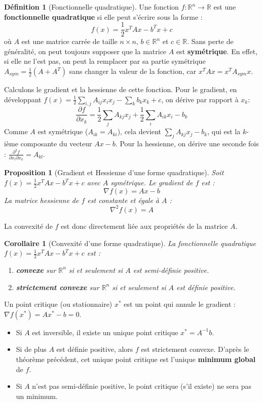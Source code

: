 \documentclass[a4paper,12pt,openany]{book}
\theoremstyle{plain}
\newtheorem{proposition}[theorem]{Proposition}
\newtheorem{corollary}[theorem]{Corollaire}
\theoremstyle{definition}
\newtheorem{definition}[theorem]{Définition}
\theoremstyle{remark}
\theoremstyle{nbstyle}
\newcommand{\R}{\mathbb{R}}
\newcommand{\grad}{\nabla}
\newcommand{\hess}{\nabla^2}
\newcommand{\T}{^T}
\begin{document}
	\begin{definition}[Fonctionnelle quadratique]
		Une fonction $f: \R^n \to \R$ est une \textbf{fonctionnelle quadratique} si elle peut s'écrire sous la forme :
		$$ f(x) = \frac{1}{2} x\T A x - b\T x + c $$
		où $A$ est une matrice carrée de taille $n \times n$, $b \in \R^n$ et $c \in \R$.
		Sans perte de généralité, on peut toujours supposer que la matrice $A$ est \textbf{symétrique}. En effet, si elle ne l'est pas, on peut la remplacer par sa partie symétrique $A_{sym} = \frac{1}{2}(A + A\T)$ sans changer la valeur de la fonction, car $x\T A x = x\T A_{sym} x$.
	\end{definition}
	
	Calculons le gradient et la hessienne de cette fonction.
	Pour le gradient, en développant $f(x) = \frac{1}{2} \sum_{i,j} A_{ij}x_i x_j - \sum_k b_k x_k + c$, on dérive par rapport à $x_k$:
	$$ \frac{\partial f}{\partial x_k} = \frac{1}{2} \sum_j A_{kj}x_j + \frac{1}{2} \sum_i A_{ik}x_i - b_k $$
	Comme $A$ est symétrique ($A_{ik} = A_{ki}$), cela devient $\sum_j A_{kj}x_j - b_k$, qui est la $k$-ième composante du vecteur $Ax - b$.
	Pour la hessienne, on dérive une seconde fois : $\frac{\partial^2 f}{\partial x_l \partial x_k} = A_{kl}$.
	
	\begin{proposition}[Gradient et Hessienne d'une forme quadratique]
		Soit $f(x) = \frac{1}{2} x\T A x - b\T x + c$ avec $A$ symétrique.
		Le gradient de $f$ est :
		$$ \grad f(x) = Ax - b $$
		La matrice hessienne de $f$ est constante et égale à $A$ :
		$$ \hess f(x) = A $$
	\end{proposition}
	
	La convexité de $f$ est donc directement liée aux propriétés de la matrice $A$.
	\begin{corollary}[Convexité d'une forme quadratique]
		La fonctionnelle quadratique $f(x) = \frac{1}{2} x\T A x - b\T x + c$ est :
		\begin{enumerate}
			\item \textbf{convexe} sur $\R^n$ si et seulement si $A$ est semi-définie positive.
			\item \textbf{strictement convexe} sur $\R^n$ si et seulement si $A$ est définie positive.
		\end{enumerate}
	\end{corollary}
	
	Un point critique (ou stationnaire) $x^*$ est un point qui annule le gradient : $\grad f(x^*) = Ax^* - b = 0$.
	\begin{itemize}
		\item Si $A$ est inversible, il existe un unique point critique $x^* = A^{-1}b$.
		\item Si de plus $A$ est définie positive, alors $f$ est strictement convexe. D'après le théorème précédent, cet unique point critique est l'unique \textbf{minimum global} de $f$.
		\item Si $A$ n'est pas semi-définie positive, le point critique (s'il existe) ne sera pas un minimum.
	\end{itemize}
	
\end{document}
